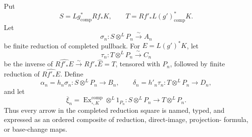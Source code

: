 \begin{definition}
\label{def:weil-pbc-completed-reduction-square}
Put
\[
 S=Lg^*_{\mathrm{comp}}Rf_*K,
 \qquad T=Rf'_*L(g')^*_{\mathrm{comp}}K.
\]
Let
\[
 \sigma_n:S\otimes^LP_n\xrightarrow{\sim}A_n
\]
be finite reduction of completed pullback.  For $E=L(g')^*K$, let
\[
 \tau_n:T\otimes^LP_n\xrightarrow{\sim}C_n
\]
be the inverse of
$\widehat{Rf'_*E}\xrightarrow{\sim}Rf'_*\widehat E=T$, tensored with
$P_n$, followed by finite reduction of $\widehat{Rf'_*E}$.  Define
\[
 \alpha_n=h_n\sigma_n:S\otimes^LP_n\to B_n,
 \qquad
 \delta_n=h'_n\tau_n:T\otimes^LP_n\to D_n,
\]
and let
\[
 \overline\xi_n=
 \operatorname{Ex}^{\mathrm{comp}}_{\square,K}\otimes^L1_{P_n}:
 S\otimes^LP_n\longrightarrow T\otimes^LP_n.
\]
Thus every arrow in the completed reduction square is named, typed, and
expressed as an ordered composite of reduction, direct-image, projection-
formula, or base-change maps.
\end{definition}


